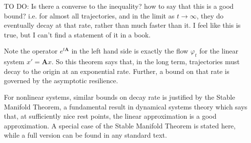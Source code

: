 TO DO: Is there a converse to the inequality? how to say that this is a good bound? i.e. for almost all trajectories, and in the limit as $t\to \infty$, they do eventually decay at that rate, rather than much faster than it. I feel like this is true, but I can't find a statement of it in a book. 

%	

Note the operator $e^{t\mathbf{A}}$ in the left hand side is exactly the flow $\varphi_t$ for the linear system $x' = \mathbf{A}x$. So this theorem says that, in the long term, trajectories must decay to the origin at an exponential rate. Further, a bound on that rate is governed by the asymptotic resilience. 

%



For nonlinear systems, similar bounds on decay rate is justified by the Stable Manifold Theorem, a fundamental result in dynamical systems theory which says that, at sufficiently nice rest points, the linear approximation is a good approximation. %
%
%
%
A special case of the Stable Manifold Theorem is stated here, while a full version can be found in any standard text. %

